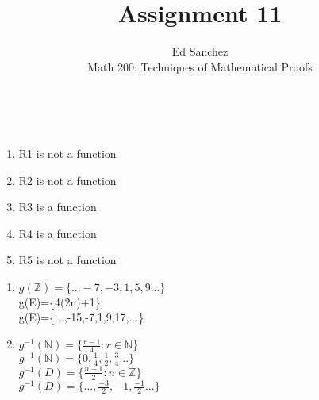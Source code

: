 \documentclass[12pt]{article}
\newenvironment{problem}[2][Problem]{\begin{trivlist}
\item[\hskip \labelsep {\bfseries #1}\hskip \labelsep {\bfseries #2.}]}{\end{trivlist}}
\begin{document}
 
\title{Assignment 11}
\author{Ed Sanchez\\ 
Math 200: Techniques of Mathematical Proofs}
 
\maketitle
 
\begin{problem}{9.9}
\text{ }\\
\end{problem}
 
\begin{enumerate}
\item R1 is not a function
\\
\item R2 is not a function
\\
\item R3 is a function
\\
\item R4 is a function
\\
\item R5 is not a function
\end{enumerate}
 
\begin{problem}{9.10}
\text{ }
\begin{enumerate}
\item $g(\mathbb{Z})=\{...-7,-3,1,5,9...\}$
\\
g(E)=\{4(2n)+1\}
\\
g(E)=\{...,-15,-7,1,9,17,...\}
\\
\item $g^{-1}(\mathbb{N})=\{ \frac{r-1}{4}: r \in \mathbb{N}\}$
\\
$g^{-1}(\mathbb{N})=\{0,\frac{1}{4},\frac{1}{2},\frac{3}{4}...\}$
\\
$g^{-1}(D)=\{\frac{n-1}{2}:n \in \mathbb{Z}\}$
\\
$g^{-1}(D)=\{...,\frac{-3}{2},-1,\frac{-1}{2}...\}$
\end{enumerate}
\end{problem}


\begin{problem}{9.11}
\text{ }
\end{problem}
\end{document}
